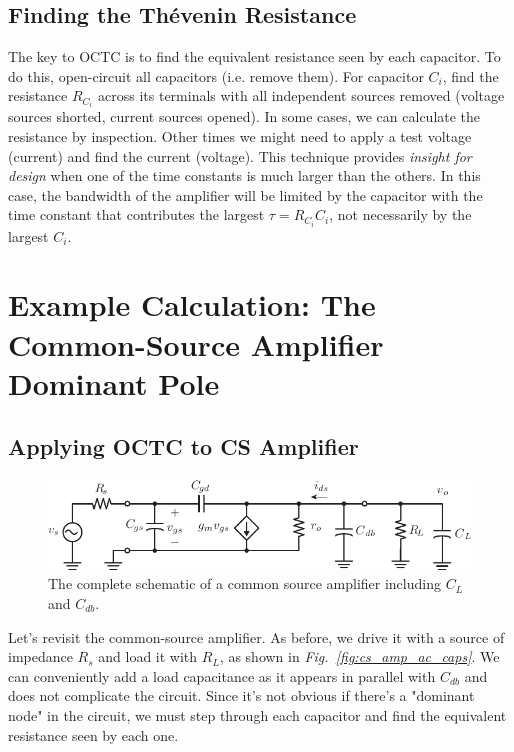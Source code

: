 \subsection{Finding the Thévenin Resistance}
The key to OCTC is to find the equivalent resistance seen by each capacitor.  To do this, open-circuit all capacitors (i.e. remove them).  For capacitor $C_i$, find the resistance $R_{C_i}$ across its terminals with all independent sources removed (voltage sources shorted, current sources opened).  In some cases, we can calculate the resistance by inspection. Other times we might need to apply a test voltage (current) and find the current (voltage).  This technique provides \textit{insight for design} when one of the time constants is much larger than the others.  In this case, the bandwidth of the amplifier will be limited by the capacitor with the time constant that contributes the largest $\tau = R_{C_i} C_i$, not necessarily by the largest $C_i$.
\newpage
\section{Example Calculation:  The Common-Source Amplifier Dominant Pole}
\subsection{Applying OCTC to CS Amplifier}
\begin{figure}[tb]
\centering
\includegraphics[scale=1]{cs_amp_ac_caps}
\caption{The complete schematic of a common source amplifier including $C_L$ and $C_{db}$.} \label{fig:cs_amp_ac_caps2}
\end{figure}
Let's revisit the common-source amplifier.  As before, we drive it with a source of impedance $R_s$ and load it with $R_L$, as shown in \emph{Fig.~\ref{fig:cs_amp_ac_caps}}.  We can conveniently add a load capacitance as it appears in parallel with $C_{db}$ and does not complicate the circuit. Since it's not obvious if there's a "dominant node" in the circuit, we must step through each capacitor and find the equivalent resistance seen by each one. 
